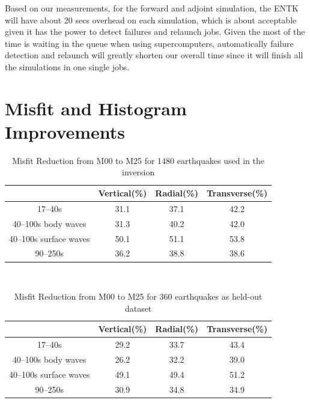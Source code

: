 \documentclass[extra,mreferee]{gji}
\begin{document}
Based on our measurements, for the forward and adjoint simulation, the ENTK will have about 20 secs overhead on each simulation, which is about acceptable given it has the power to detect failures and relaunch jobs. Given the most of the time is waiting in the queue when using supercomputers, automatically failure detection and relaunch will greatly shorten our overall time since it will finish all the simulations in one single jobs.


\section{Misfit and Histogram Improvements}

\begin{table}[!htb]
  \centering
  \begin{tabular}{|c|c|c|c|}
    \hline
     ~          &  Vertical(\%) & Radial(\%) &  Transverse(\%) \\
    \hline
    17--40s                &    31.1    &       37.1 &       42.2 \\
    40--100s body waves    &    31.3    &       40.2 &       42.0 \\
    40--100s surface waves &    50.1    &       51.1 &       53.8 \\
    90--250s               &    36.2    &       38.8 &       38.6 \\
    \hline
  \end{tabular}\\
  \caption{Misfit Reduction from M00 to M25 for 1480 earthquakes used in the inversion}
  \label{table:categories}
\end{table}

\begin{table}[!htb]
  \centering
  \begin{tabular}{|c|c|c|c|}
    \hline
    ~          &  Vertical(\%) & Radial(\%) &  Transverse(\%) \\
    \hline
    17--40s                &         29.2 &       33.7 &       43.4 \\
    40--100s body waves    &         26.2 &       32.2 &       39.0 \\
    40--100s surface waves &         49.1 &       49.4 &       51.2 \\
    90--250s               &         30.9 &       34.8 &       34.9 \\
    \hline
  \end{tabular}\\
  \caption{Misfit Reduction from M00 to M25 for 360 earthquakes as held-out dataset}
  \label{table:misfit_reduction_M00_M25_360}
\end{table}
\end{document}
